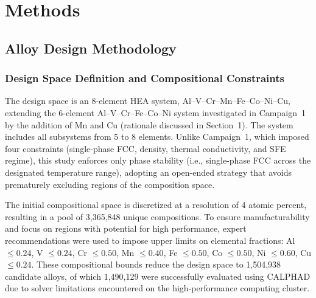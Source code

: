 \documentclass[preprint,12pt,times]{elsarticle}  %
\begin{document}
\section{Methods}\label{sec:Material and methods}

\subsection{Alloy Design Methodology}

\subsubsection{Design Space Definition and Compositional Constraints}

The design space is an 8-element HEA system, Al--V--Cr--Mn--Fe--Co--Ni--Cu, extending the 6-element Al--V--Cr--Fe--Co--Ni system investigated in Campaign~1~\cite{hastings2025accelerated} by the addition of Mn and Cu (rationale discussed in Section~1). The system includes all subsystems from 5 to 8 elements. Unlike Campaign~1, which imposed four constraints (single-phase FCC, density, thermal conductivity, and SFE regime), this study enforces only phase stability (i.e., single-phase FCC across the designated temperature range), adopting an open-ended strategy that avoids prematurely excluding regions of the composition space.

The initial compositional space is discretized at a resolution of 4 atomic percent, resulting in a pool of 3,365,848 unique compositions. To ensure manufacturability and focus on regions with potential for high performance, expert recommendations were used to impose upper limits on elemental fractions: Al $\leq 0.24$, V $\leq 0.24$, Cr $\leq 0.50$, Mn $\leq 0.40$, Fe $\leq 0.50$, Co $\leq 0.50$, Ni $\leq 0.60$, Cu $\leq 0.24$. These compositional bounds reduce the design space to 1,504,938 candidate alloys, of which 1,490,129 were successfully evaluated using CALPHAD due to solver limitations encountered on the high-performance computing cluster.
\end{document}
